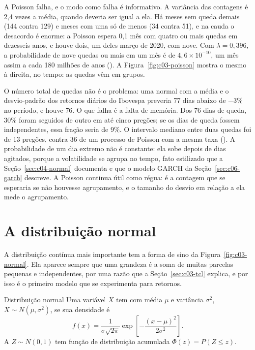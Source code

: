 A Poisson falha, e o modo como falha é informativo. A variância das contagens é 2,4 vezes a média, quando deveria ser igual a ela. Há meses sem queda demais (144 contra 129) e meses com uma só de menos (34 contra 51), e na cauda o desacordo é enorme: a Poisson espera 0,1 mês com quatro ou mais quedas em dezesseis anos, e houve dois, um deles março de 2020, com nove. Com $\lambda = 0,396$, a probabilidade de nove quedas ou mais em um mês é de $4,6 \times 10^{-10}$, um mês assim a cada 180 milhões de anos (). A Figura~\ref{fig:c03-poisson} mostra o mesmo à direita, no tempo: as quedas vêm em grupos.


O número total de quedas não é o problema: uma normal com a média e o desvio-padrão dos retornos diários do Ibovespa preveria 77 dias abaixo de $-3\%$ no período, e houve 76. O que falha é a falta de memória. Dos 76 dias de queda, 30\% foram seguidos de outro em até cinco pregões; se os dias de queda fossem independentes, essa fração seria de 9\%. O intervalo mediano entre duas quedas foi de 13 pregões, contra 36 de um processo de Poisson com a mesma taxa (). A probabilidade de um dia extremo não é constante: ela sobe depois de dias agitados, porque a volatilidade se agrupa no tempo, fato estilizado que a Seção~\ref{sec:c04-normal} documenta e que o modelo GARCH da Seção~\ref{sec:c06-garch} descreve. A Poisson continua útil como régua: é a contagem que se esperaria se não houvesse agrupamento, e o tamanho do desvio em relação a ela mede o agrupamento.

\section{A distribuição normal}
\label{sec:c03-normal}

A distribuição contínua mais importante tem a forma de sino da Figura~\ref{fig:c03-normal}. Ela aparece sempre que uma grandeza é a soma de muitas parcelas pequenas e independentes, por uma razão que a Seção~\ref{sec:c03-tcl} explica, e por isso é o primeiro modelo que se experimenta para retornos.

\begin{definicao}{Distribuição normal}
Uma variável $X$ tem  com média $\mu$ e variância $\sigma^2$, $X \sim N(\mu, \sigma^2)$, se sua densidade é
\begin{equation}
  f(x) = \frac{1}{\sigma\sqrt{2\pi}} \exp\!\left[-\frac{(x-\mu)^2}{2\sigma^2}\right] .
  \label{eq:c03-normal}
\end{equation}
A  $Z \sim N(0, 1)$ tem função de distribuição acumulada $\Phi(z) = P(Z \le z)$.
\end{definicao}

